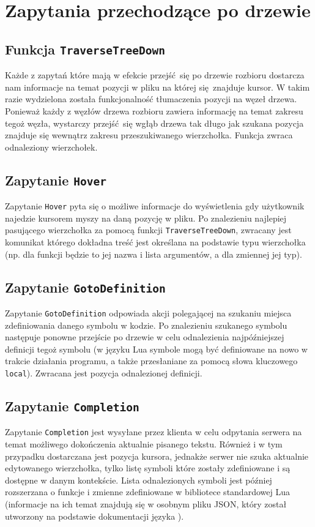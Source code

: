 \section{Zapytania przechodzące po drzewie}
\subsection{Funkcja \texttt{TraverseTreeDown}}
Każde z zapytań które mają w efekcie przejść się po drzewie rozbioru dostarcza nam informacje na temat pozycji w pliku na której się znajduje kursor. W takim razie wydzielona została funkcjonalność tłumaczenia pozycji na węzeł drzewa. Ponieważ każdy z węzłów drzewa rozbioru zawiera informację na temat zakresu tegoż węzła, wystarczy przejść się wgłąb drzewa tak długo jak szukana pozycja znajduje się wewnątrz zakresu przeszukiwanego wierzchołka. Funkcja zwraca odnaleziony wierzchołek.

\subsection{Zapytanie \texttt{Hover}}
Zapytanie \texttt{Hover} pyta się o możliwe informacje do wyświetlenia gdy użytkownik najedzie kursorem myszy na daną pozycję w pliku. Po znalezieniu najlepiej pasującego wierzchołka za pomocą funkcji \texttt{TraverseTreeDown}, zwracany jest komunikat którego dokładna treść jest określana na podstawie typu wierzchołka (np. dla funkcji będzie to jej nazwa i lista argumentów, a dla zmiennej jej typ).

\subsection{Zapytanie \texttt{GotoDefinition}}
Zapytanie \texttt{GotoDefinition} odpowiada akcji polegającej na szukaniu miejsca zdefiniowania danego symbolu w kodzie. Po znalezieniu szukanego symbolu następuje ponowne przejście po drzewie w celu odnalezienia najpóźniejszej definicji tegoż symbolu (w języku Lua symbole mogą być definiowane na nowo w trakcie działania programu, a także przesłaniane za pomocą słowa kluczowego \texttt{local}). Zwracana jest pozycja odnalezionej definicji.

\subsection{Zapytanie \texttt{Completion}}
Zapytanie \texttt{Completion} jest wysyłane przez klienta w celu odpytania serwera na temat możliwego dokończenia aktualnie pisanego tekstu. Również i w tym przypadku dostarczana jest pozycja kursora, jednakże serwer nie szuka aktualnie edytowanego wierzchołka, tylko listę symboli które zostały zdefiniowane i są dostępne w danym kontekście. Lista odnalezionych symboli jest później rozszerzana o funkcje i zmienne zdefiniowane w bibliotece standardowej Lua (informacje na ich temat znajdują się w osobnym pliku JSON, który został utworzony na podstawie dokumentacji języka \cite{lua_lib}).